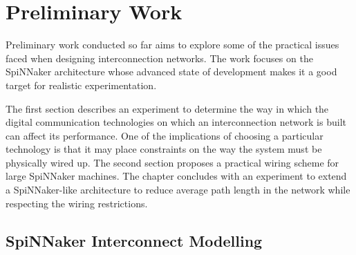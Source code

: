 \chapter{Preliminary Work}
	
	
	Preliminary work conducted so far aims to explore some of the practical issues
	faced when designing interconnection networks. The work focuses on the
	SpiNNaker architecture whose advanced state of development makes it a good
	target for realistic experimentation.
	
	The first section describes an experiment to determine the way in which the
	digital communication technologies on which an interconnection network is
	built can affect its performance. One of the implications of choosing a
	particular technology is that it may place constraints on the way the system
	must be physically wired up. The second section proposes a practical wiring
	scheme for large SpiNNaker machines. The chapter concludes with an experiment
	to extend a SpiNNaker-like architecture to reduce average path length in the
	network while respecting the wiring restrictions.
	
	
	\section{SpiNNaker Interconnect Modelling}
		
